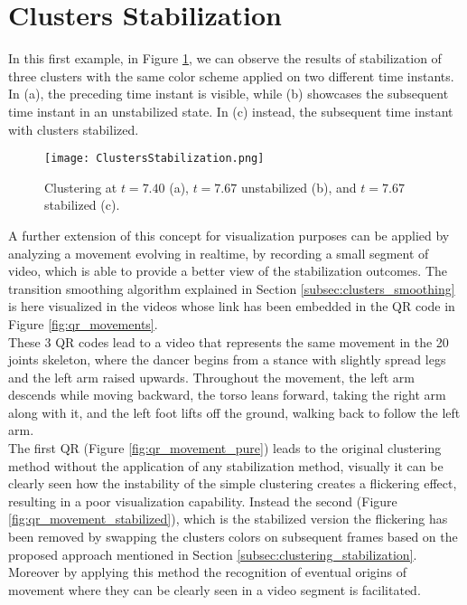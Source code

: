 \clearpage
\section{Clusters Stabilization}
In this first example, in Figure \ref{fig:stabilization_results}, we can observe the results of stabilization of three clusters with the same color scheme applied on two different time instants. 
In (a), the preceding time instant is visible, while (b) showcases the subsequent time instant in an unstabilized state. 
In (c) instead, the subsequent time instant with clusters stabilized.
\begin{figure}[H]
  \centering
  \texttt{[image: ClustersStabilization.png]}
  \caption{Clustering at $t=7.40$ (a), $t=7.67$ unstabilized (b), and $t=7.67$ stabilized (c).}
  \label{fig:stabilization_results}
\end{figure}

A further extension of this concept for visualization purposes can be applied by analyzing a movement evolving in realtime, by recording a small segment of video, which is able to provide a better view of the stabilization outcomes.
The transition smoothing algorithm explained in Section \ref{subsec:clusters_smoothing} is here visualized in the videos whose link has been embedded in the QR code in Figure \ref{fig:qr_movements}. \\

These 3 QR codes lead to a video that represents the same movement in the 20 joints skeleton, where the dancer begins from a stance with slightly spread legs and the left arm raised upwards.
Throughout the movement, the left arm descends while moving backward, the torso leans forward, taking the right arm along with it, and the left foot lifts off the ground, walking back to follow the left arm.\\

The first QR (Figure \ref{fig:qr_movement_pure}) leads to the original clustering method without the application of any stabilization method, visually it can be clearly seen how the instability of the simple clustering creates a flickering effect, resulting in a poor visualization capability.
Instead the second (Figure \ref{fig:qr_movement_stabilized}), which is the stabilized version the flickering has been removed by swapping the clusters colors on subsequent frames based on the proposed approach mentioned in Section \ref{subsec:clustering_stabilization}.
Moreover by applying this method the recognition of eventual origins of movement where they can be clearly seen in a video segment is facilitated. \\

